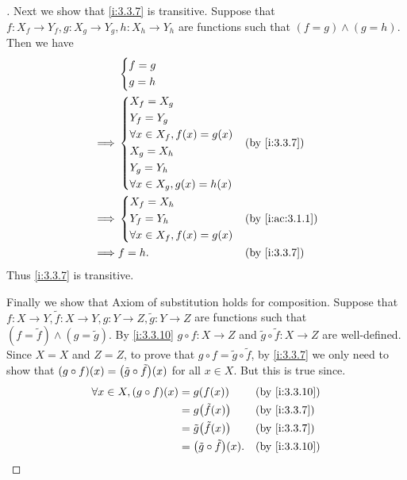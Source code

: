 \begin{proof}[]
  Next we show that \cref{i:3.3.7} is transitive.
  Suppose that \(f : X_f \to Y_f, g : X_g \to Y_g, h : X_h \to Y_h\) are functions such that \((f = g) \land (g = h)\).
  Then we have
  \begin{align*}
             & \begin{dcases}
                 f = g \\
                 g = h
               \end{dcases}                                       \\
    \implies & \begin{dcases}
                 X_f = X_g                      \\
                 Y_f = Y_g                      \\
                 \forall x \in X_f, f(x) = g(x) \\
                 X_g = X_h                      \\
                 Y_g = Y_h                      \\
                 \forall x \in X_g, g(x) = h(x)
               \end{dcases} &  & \by{i:3.3.7}                      \\
    \implies & \begin{dcases}
                 X_f = X_h \\
                 Y_f = Y_h \\
                 \forall x \in X_f, f(x) = g(x)
               \end{dcases}    &  & \by{i:ac:3.1.1}                \\
    \implies & f = h.                            &  & \by{i:3.3.7}
  \end{align*}
  Thus \cref{i:3.3.7} is transitive.

  Finally we show that Axiom of substitution holds for composition.
  Suppose that \(f : X \to Y, \tilde{f} : X \to Y, g : Y \to Z, \tilde{g} : Y \to Z\) are functions such that \((f = \tilde{f}) \land (g = \tilde{g})\).
  By \cref{i:3.3.10} \(g \circ f : X \to Z\) and \(\tilde{g} \circ \tilde{f} : X \to Z\) are well-defined.
  Since \(X = X\) and \(Z = Z\), to prove that \(g \circ f = \tilde{g} \circ \tilde{f}\), by \cref{i:3.3.7} we only need to show that \((g \circ f)(x) = \pa{\tilde{g} \circ \tilde{f}}(x)\) for all \(x \in X\).
  But this is true since.
  \begin{align*}
    \forall x \in X, (g \circ f)(x) & = g(f(x))                            &  & \by{i:3.3.10} \\
                                    & = g\pa{\tilde{f}(x)}                 &  & \by{i:3.3.7}  \\
                                    & = \tilde{g}\pa{\tilde{f}(x)}         &  & \by{i:3.3.7}  \\
                                    & = \pa{\tilde{g} \circ \tilde{f}}(x). &  & \by{i:3.3.10}
  \end{align*}
\end{proof}


